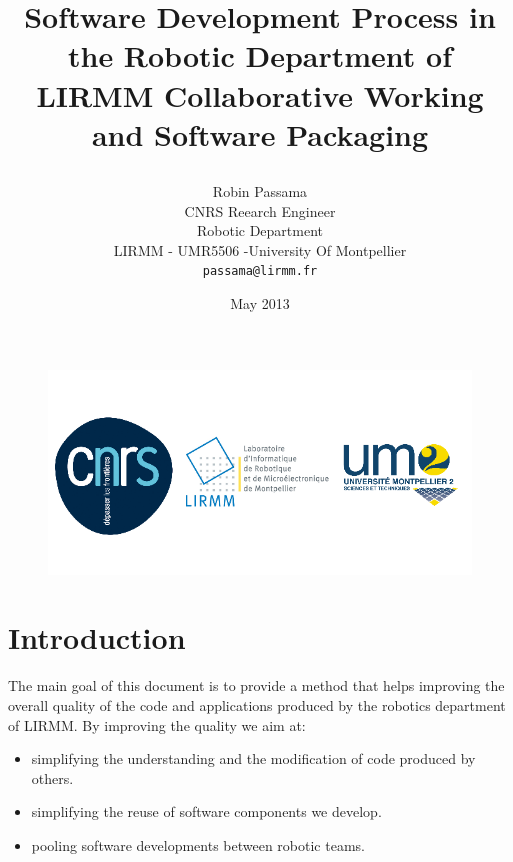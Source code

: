 \documentclass[12pt,a4paper]{article}
\begin{document}
\title{%
    \begin{minipage}\linewidth
        \centering\bfseries\sffamily
        Software Development Process in the Robotic Department of LIRMM
        \vskip3pt
        \large Collaborative Working and Software Packaging
    \end{minipage}
}

\author{
	Robin Passama\\
	CNRS Reearch Engineer\\
	Robotic Department\\	
	LIRMM - UMR5506 -University Of Montpellier\\	
	\texttt{passama@lirmm.fr}}
\date{May 2013}

\maketitle

\bigskip
\bigskip
\bigskip
\bigskip
\bigskip
\bigskip

\begin{figure}
\center
\includegraphics[scale=0.7]{images/logos_officiels.png}
\end{figure}

\pagebreak

\section*{Introduction}
The main goal of this document is to provide a method that helps improving the overall quality of the code and applications produced by the robotics department of LIRMM. By improving the quality we aim at:
\begin{itemize}
\item simplifying the understanding and the modification of code produced by others.
\item simplifying the reuse of software components we develop.
\item pooling software developments between robotic teams.
\end{itemize}
\end{document}
